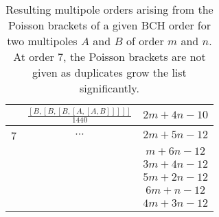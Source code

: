 \begin{table}[H]
\begin{tabular}{ccc}
        & $\frac{\left[B,\left[B,\left[B,\left[A,\left[A,B\right]\right]\right]\right]\right]}{1440}$ & $2 m + 4 n - 10$ \\
      \midrule
      7 & $\cdots$ & $2m + 5n - 12$ \\
        &  & $m + 6n - 12$ \\
        &  & $3m + 4n - 12$ \\
        &  & $5m + 2n - 12$ \\
        &  & $6m + n - 12$ \\
        &  & $4m + 3n - 12$ \\
      \bottomrule
  \end{tabular}
  \caption{Resulting multipole orders arising from the Poisson brackets of a given BCH order for two
  multipoles $A$ and $B$ of order $m$ and $n$. At order 7, the Poisson brackets are not
  given as duplicates grow the list significantly.}
  \label{table:appendix:transfer_maps:bch_resulting_orders}
\end{table}


